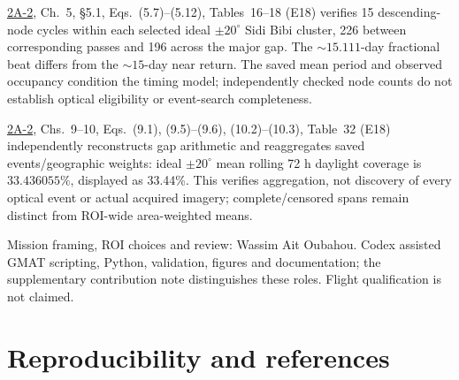 \documentclass[10pt,a4paper]{article}
\newcommand{\analref}[1]{\href{AtlasSAT_2A-2_Analytical_Derivations_v0.2.1_Public_RC_v0_2.pdf}{2A-2}, #1 (E18)}
\begin{document}
\analref{Ch.~5, \S5.1, Eqs.~(5.7)--(5.12), Tables~16--18} verifies 15 descending-node cycles within each selected ideal \(\pm20^\circ\) Sidi Bibi cluster, 226 between corresponding passes and 196 across the major gap. The \(\sim15.111\)-day fractional beat differs from the \(\sim15\)-day near return. The saved mean period and observed occupancy condition the timing model; independently checked node counts do not establish optical eligibility or event-search completeness.

\analref{Chs.~9--10, Eqs.~(9.1), (9.5)--(9.6), (10.2)--(10.3), Table~32} independently reconstructs gap arithmetic and reaggregates saved events/geographic weights: ideal \(\pm20^\circ\) mean rolling 72 h daylight coverage is \(33.436055\%\), displayed as 33.44\%. This verifies aggregation, not discovery of every optical event or actual acquired imagery; complete/censored spans remain distinct from ROI-wide area-weighted means.

Mission framing, ROI choices and review: Wassim Ait Oubahou. Codex assisted GMAT scripting, Python, validation, figures and documentation; the supplementary contribution note distinguishes these roles. Flight qualification is not claimed.

\clearpage
\section{Reproducibility and references}
\end{document}
